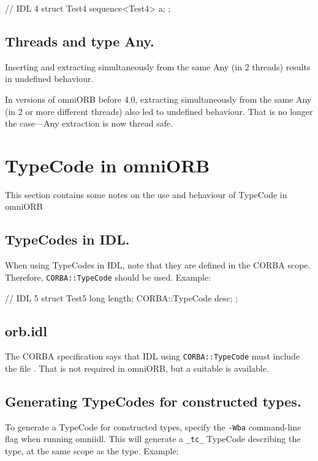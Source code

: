 \documentclass[11pt,oneside,a4paper]{book}
\newcommand{\type}[1]{\texttt{#1}}
\newcommand{\code}[1]{\texttt{#1}}
\begin{document}
\begin{idllisting}
// IDL 4
struct Test4 {
  sequence<Test4> a;
};
\end{idllisting}


\subsection{Threads and type Any.}
Inserting and extracting simultaneously from the same Any (in 2
threads) results in undefined behaviour.

In versions of omniORB before 4.0, extracting simultaneously from the
same Any (in 2 or more different threads) also led to undefined
behaviour. That is no longer the case---Any extraction is now thread
safe.


\section{TypeCode in omniORB}

This section contains some notes on the use and behaviour of TypeCode
in omniORB

\subsection{TypeCodes in IDL.}

When using TypeCodes in IDL, note that they are defined in the CORBA
scope.  Therefore, \type{CORBA::TypeCode} should be used. Example:

\begin{idllisting}
// IDL 5
struct Test5 {
  long length;
  CORBA::TypeCode desc;
};
\end{idllisting}

\subsection{orb.idl}

The CORBA specification says that IDL using \type{CORBA::TypeCode}
must include the file . That is not required in omniORB,
but a suitable  is available.


\subsection{Generating TypeCodes for constructed types.}

To generate a TypeCode for constructed types, specify the
\texttt{-Wba} command-line flag when running omniidl. This will
generate a \code{\_tc\_} TypeCode describing the type, at the same
scope as the type. Example:
\end{document}
